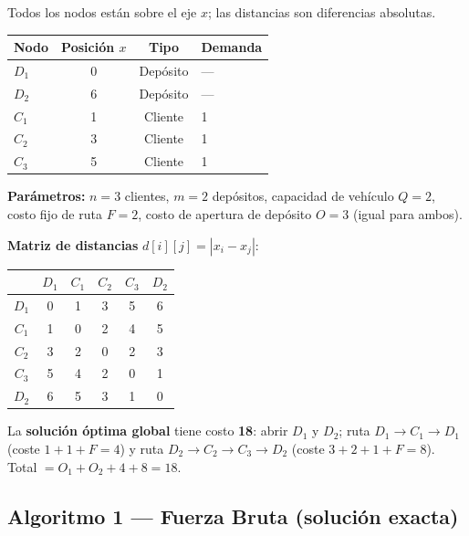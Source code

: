 \documentclass[12pt,a4paper]{article}
\begin{document}
Todos los nodos están sobre el eje $x$; las distancias son diferencias absolutas.

\begin{center}
\begin{tabular}{lccl}
\toprule
Nodo  & Posición $x$ & Tipo     & Demanda \\
\midrule
$D_1$ & 0            & Depósito & ---     \\
$D_2$ & 6            & Depósito & ---     \\
$C_1$ & 1            & Cliente  & 1       \\
$C_2$ & 3            & Cliente  & 1       \\
$C_3$ & 5            & Cliente  & 1       \\
\bottomrule
\end{tabular}
\end{center}

\medskip
\textbf{Parámetros:} $n=3$ clientes, $m=2$ depósitos, capacidad de vehículo $Q=2$, costo fijo de ruta $F=2$, costo de apertura de depósito $O=3$ (igual para ambos).

\medskip
\textbf{Matriz de distancias} $d[i][j] = |x_i - x_j|$:

\begin{center}
\begin{tabular}{c|ccccc}
\toprule
      & $D_1$ & $C_1$ & $C_2$ & $C_3$ & $D_2$ \\
\midrule
$D_1$ & 0 & 1 & 3 & 5 & 6 \\
$C_1$ & 1 & 0 & 2 & 4 & 5 \\
$C_2$ & 3 & 2 & 0 & 2 & 3 \\
$C_3$ & 5 & 4 & 2 & 0 & 1 \\
$D_2$ & 6 & 5 & 3 & 1 & 0 \\
\bottomrule
\end{tabular}
\end{center}

\begin{nota}
La \textbf{solución óptima global} tiene costo \textbf{18}: abrir $D_1$ y $D_2$; ruta $D_1 \!\to\! C_1 \!\to\! D_1$ (coste $1+1+F=4$) y ruta $D_2 \!\to\! C_2 \!\to\! C_3 \!\to\! D_2$ (coste $3+2+1+F=8$). Total $= O_1 + O_2 + 4 + 8 = 18$.
\end{nota}

\subsection*{Algoritmo 1 — Fuerza Bruta (solución exacta)}
\end{document}
